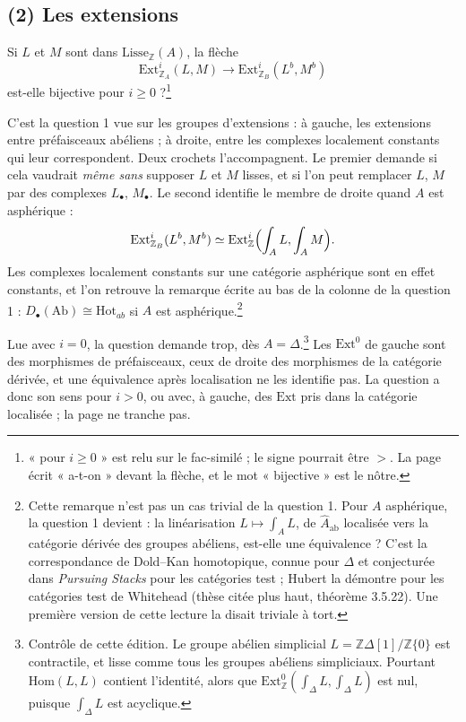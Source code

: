 \documentclass[11pt,a4paper]{article}
\begin{document}
\subsection*{(2) Les extensions}

Si $L$ et $M$ sont dans $\mathrm{Lisse}_{\mathbb{Z}}(A)$, la flèche
\[
\mathrm{Ext}^{i}_{\mathbb{Z}_{A}}(L, M) \longrightarrow
\mathrm{Ext}^{i}_{\mathbb{Z}_{B}}(L^{b}, M^{b})
\]
est-elle bijective pour $i \geq 0$ ?\footnote{« pour $i \geq 0$ » est relu sur le
fac-similé ; le signe pourrait être $>$. La page écrit « a-t-on » devant la
flèche, et le mot « bijective » est le nôtre.}

C'est la question 1 vue sur les groupes d'extensions : à gauche, les
extensions entre préfaisceaux abéliens ; à droite, entre les complexes
localement constants qui leur correspondent. Deux crochets l'accompagnent. Le
premier demande si cela vaudrait \emph{même sans} supposer $L$ et $M$ lisses,
et si l'on peut remplacer $L$, $M$ par des complexes $L_{\bullet}$,
$M_{\bullet}$. Le second identifie le membre de droite quand $A$ est asphérique
:
\[
\mathrm{Ext}^{i}_{\mathbb{Z}_{B}}(L^{b}, M^{b}) \simeq
\mathrm{Ext}^{i}_{\mathbb{Z}}\Bigl(\int_{A} L, \int_{A} M\Bigr).
\]
Les complexes localement constants sur une catégorie asphérique sont en effet
constants, et l'on retrouve la remarque écrite au bas de la colonne de la
question 1 : $D_{\bullet}(\mathrm{Ab}) \cong \mathrm{Hot}_{ab}$ si $A$ est
asphérique.\footnote{Cette remarque n'est pas un cas trivial de la question 1.
Pour $A$ asphérique, la question 1 devient : la linéarisation
$L \mapsto \int_{A} L$, de $\hat{A}_{\mathrm{ab}}$ localisée vers la catégorie
dérivée des groupes abéliens, est-elle une équivalence ? C'est la
correspondance de Dold--Kan homotopique, connue pour $\Delta$ et conjecturée
dans \emph{Pursuing Stacks} pour les catégories test ; Hubert la démontre pour
les catégories test de Whitehead (thèse citée plus haut, théorème 3.5.22). Une
première version de cette lecture la disait triviale à tort.}

Lue avec $i = 0$, la question demande trop, dès $A = \Delta$.\footnote{Contrôle de
cette édition. Le groupe abélien simplicial
$L = \mathbb{Z}\Delta[1]/\mathbb{Z}\{0\}$ est contractile, et lisse comme tous
les groupes abéliens simpliciaux. Pourtant $\mathrm{Hom}(L, L)$ contient
l'identité, alors que
$\mathrm{Ext}^{0}_{\mathbb{Z}}(\int_{\Delta} L, \int_{\Delta} L)$ est nul,
puisque $\int_{\Delta} L$ est acyclique.} Les $\mathrm{Ext}^{0}$ de gauche sont
des morphismes de préfaisceaux, ceux de droite des morphismes de la
catégorie dérivée, et une équivalence après localisation ne les identifie pas.
La question a donc son sens pour $i > 0$, ou avec, à gauche, des $\mathrm{Ext}$
pris dans la catégorie localisée ; la page ne tranche pas.
\end{document}
